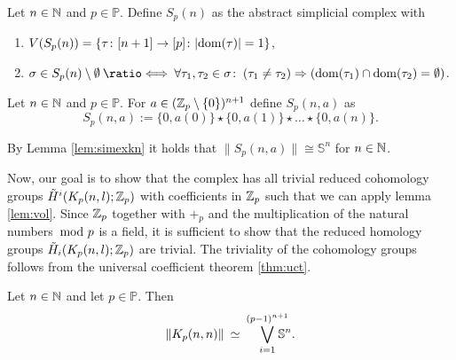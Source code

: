 \begin{defin}
  Let $n \in \mathbb{N}$ and $p \in \mathbb{P}$. Define $S_p(n)$ as the abstract simplicial complex with
  \begin{enumerate}[label=\roman*.)]
    \item $V(S_p(n)) = \{\tau\colon [n+1]\to [p]\colon |{\rm dom}(\tau)| = 1\}$,
    \item $\sigma \in S_p(n)\setminus\emptyset \: \longeq \: \forall \tau_1,\tau_2\in\sigma\colon \: (\tau_1 \neq \tau_2) \Rightarrow (\dom(\tau_1) \cap \dom(\tau_2) = \emptyset)$.
  \end{enumerate}
\end{defin}

\begin{defin}
  Let $n \in \mathbb{N}$ and $p\in\mathbb{P}$. For $a \in (\mathbb{Z}_p\setminus\{0\})^{n+1}$ define $S_p(n,a)$ as
  \begin{equation*}
    S_p(n,a) := \{0, a(0)\} \star \{0,a(1)\} \star \ldots \star \{0,a(n)\}.
  \end{equation*}
\end{defin}

\begin{rem}\label{rem:s}
  By Lemma \ref{lem:simexkn} it holds that $\lVert S_p(n,a) \rVert \cong \mathbb{S}^{n}$ for $n\in\mathbb{N}$.
\end{rem}

Now, our goal is to show that the complex has all trivial reduced cohomology groups $\tilde{H}^i(K_p(n,l); \mathbb{Z}_p)$ with coefficients in $\mathbb{Z}_p$ such that we can apply lemma \ref{lem:vol}. Since $\mathbb{Z}_p$ together with $+_p$ and the multiplication of the natural numbers $\hspace*{-5px}\mod p$ is a field, it is sufficient to show that the reduced homology groups $\tilde{H}_i(K_p(n,l); \mathbb{Z}_p)$ are trivial. The triviality of the cohomology groups follows from the universal coefficient theorem \ref{thm:uct}. 

\begin{lemma}
  Let $n \in \mathbb{N}$ and let $p \in \mathbb{P}$. Then
  \begin{equation*}
    \lVert K_p(n,n) \rVert \: \simeq \: \bigvee_{i=1}^{(p-1)^{n+1}}\hspace*{-10px}\mathbb{S}^{n}.
  \end{equation*}
\end{lemma}

